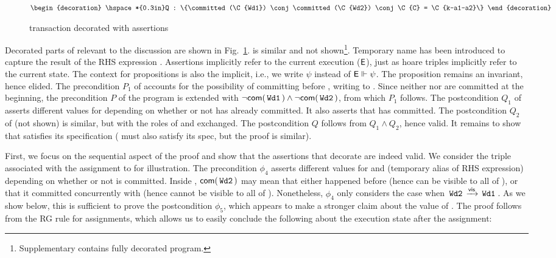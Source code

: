 \begin{figure}
\begin{txnimpcode}
$\begin{decoration}
  \hspace*{0.3in}Q : \{\committed(\C{Wd1}) \conj \committed(\C{Wd2}) \conj
                          \C{C} = \C{k-a1-a2}\}
\end{decoration}$
\end{txnimpcode}

\caption{ transaction decorated with assertions}
\label{fig:wd1-decorated}
\end{figure}

Decorated parts of  relevant to the discussion are shown in
Fig.~\ref{fig:wd1-decorated}.   is similar and not
shown\footnote{Supplementary contains fully decorated program.}.
Temporary name  has been introduced to capture the result of the
RHS expression .  Assertions implicitly refer to the current
execution ($\textsf{E}$), just as hoare triples implicitly refer to the
current state.  The context for propositions is also the implicit,
i.e., we write $\psi$ instead of $\textsf{E} \Vdash \psi$. The proposition  remains an invariant, hence elided. The precondition
$P_1$ of  accounts for the possibility of  committing
before , writing  to . Since neither  nor
 are committed at the beginning, the precondition $P$ of the
program is extended with $\neg\textsf{com}(\,{\tt Wd1}\,) \wedge
\neg\textsf{com}(\,{\tt Wd2}\,)$, from which $P_1$ follows. The postcondition
$Q_1$ of  asserts different values for  depending on
whether or not  has already committed.  It also asserts that
 has committed. The postcondition $Q_2$ of  (not shown)
is similar, but with the roles of  and  exchanged. The
postcondition $Q$ follows from $Q_1 \wedge Q_2$, hence valid. It
remains to show that  satisfies its specification ( must
also satisfy its spec, but the proof is similar).

First, we focus on the sequential aspect of the proof and show that
the assertions that decorate  are indeed valid. We consider the
triple associated with the assignment to  for illustration. The
precondition $\phi_4$ asserts different values for  and 
(temporary alias of RHS expression) depending on whether or not
 is committed. Inside , $\textsf{com}(\,{\tt Wd2}\,)$ may mean
that either  happened before  (hence can be visible to
all of ), or that it committed concurrently with  (hence
cannot be visible to all of ).  Nonetheless, $\phi_4$ only
considers the case when $\,{\tt Wd2}\, \xrightarrow{\textsf{vis}} \,{\tt Wd1}\,$. As we show below,
this is sufficient to prove the postcondition $\phi_5$, which appears
to make a stronger claim about the value of . The proof follows
from the RG rule  for assignments, which allows us
to easily conclude the following about the execution state after the
assignment:

